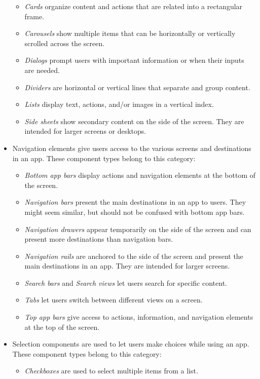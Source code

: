\documentclass[11pt,titlepage,oneside,openany]{book}
\begin{document}
\begin{itemize}
\begin{itemize}
		\item \emph{Cards} organize content and actions that are related into a rectangular frame.
		\item \emph{Carousels} show multiple items that can be horizontally or vertically scrolled across the screen.
		\item \emph{Dialogs} prompt users with important information or when their inputs are needed.
		\item \emph{Dividers} are horizontal or vertical lines that separate and group content.
		\item \emph{Lists} display text, actions, and/or images in a vertical index.
		\item \emph{Side sheets} show secondary content on the side of the screen. They are intended for larger screens or desktops.
	\end{itemize}
	\item Navigation elements give users access to the various screens and destinations in an app. These component types belong to this category:
	\begin{itemize}
		\item \emph{Bottom app bars} display actions and navigation elements at the bottom of the screen. 
		\item \emph{Navigation bars} present the main destinations in an app to users. They might seem similar, but should not be confused with bottom app bars.
		\item \emph{Navigation drawers} appear temporarily on the side of the screen and can present more destinations than navigation bars.
		\item \emph{Navigation rails} are anchored to the side of the screen and present the main destinations in an app. They are intended for larger screens.
		\item \emph{Search bars} and \emph{Search views} let users search for specific content.
		\item \emph{Tabs} let users switch between different views on a screen.
		\item \emph{Top app bars} give access to actions, information, and navigation elements at the top of the screen.
	\end{itemize}
	\item Selection components are used to let users make choices while using an app. These component types belong to this category:
	\begin{itemize}
		\item \emph{Checkboxes} are used to select multiple items from a list.

\end{itemize}
\end{itemize}
\end{document}

